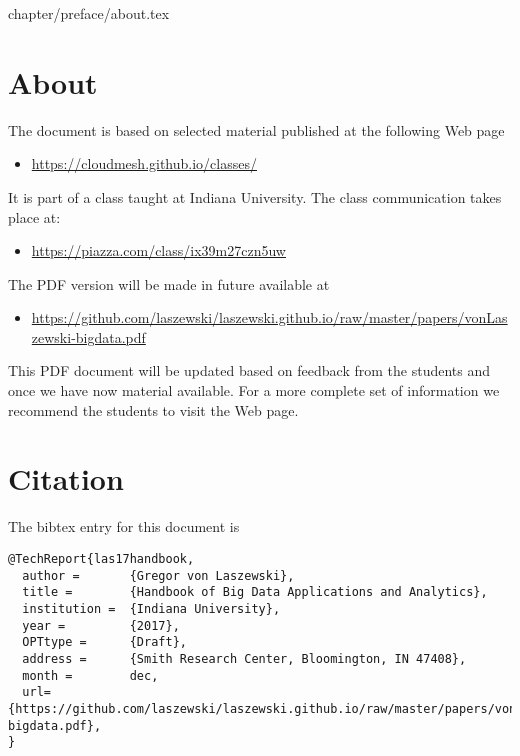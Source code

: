 \begin{fileremark}chapter/preface/about.tex\end{fileremark}

\section{About}\label{about}

The document is based on selected material published at the following
Web page

\begin{itemize}
\item
  \url{https://cloudmesh.github.io/classes/}
\end{itemize}

It is part of a class taught at Indiana University. The class
communication takes place at:

\begin{itemize}
\item
  \url{https://piazza.com/class/ix39m27czn5uw}
\end{itemize}

The PDF version will be made in future available at 

\begin{itemize}
\item
\url{https://github.com/laszewski/laszewski.github.io/raw/master/papers/vonLaszewski-bigdata.pdf}
\end{itemize}

This PDF document will be updated based on feedback from the students
and once we have now material available. For a more complete set of
information we recommend the students to visit the Web page.

\section{Citation}

The bibtex entry for this document is

\begin{verbatim}
@TechReport{las17handbook,
  author =       {Gregor von Laszewski},
  title =        {Handbook of Big Data Applications and Analytics},
  institution =  {Indiana University},
  year =         {2017},
  OPTtype =      {Draft},
  address =      {Smith Research Center, Bloomington, IN 47408},
  month =        dec,
  url={https://github.com/laszewski/laszewski.github.io/raw/master/papers/vonLaszewski-bigdata.pdf},
}
\end{verbatim}

